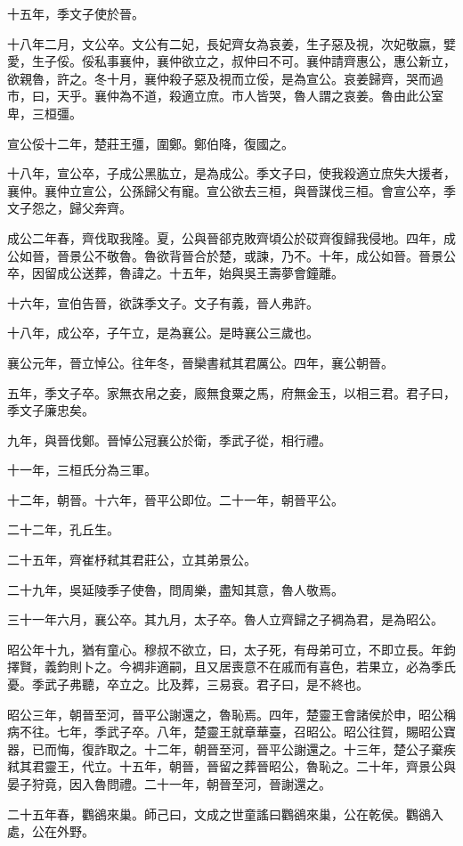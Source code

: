十五年，季文子使於晉。

十八年二月，文公卒。文公有二妃，長妃齊女為哀姜，生子惡及視，次妃敬嬴，嬖愛，生子俀。俀私事襄仲，襄仲欲立之，叔仲曰不可。襄仲請齊惠公，惠公新立，欲親魯，許之。冬十月，襄仲殺子惡及視而立俀，是為宣公。哀姜歸齊，哭而過市，曰，天乎。襄仲為不道，殺適立庶。市人皆哭，魯人謂之哀姜。魯由此公室卑，三桓彊。

宣公俀十二年，楚莊王彊，圍鄭。鄭伯降，復國之。

十八年，宣公卒，子成公黑肱立，是為成公。季文子曰，使我殺適立庶失大援者，襄仲。襄仲立宣公，公孫歸父有寵。宣公欲去三桓，與晉謀伐三桓。會宣公卒，季文子怨之，歸父奔齊。

成公二年春，齊伐取我隆。夏，公與晉郤克敗齊頃公於砹齊復歸我侵地。四年，成公如晉，晉景公不敬魯。魯欲背晉合於楚，或諫，乃不。十年，成公如晉。晉景公卒，因留成公送葬，魯諱之。十五年，始與吳王壽夢會鐘離。

十六年，宣伯告晉，欲誅季文子。文子有義，晉人弗許。

十八年，成公卒，子午立，是為襄公。是時襄公三歲也。

襄公元年，晉立悼公。往年冬，晉欒書弒其君厲公。四年，襄公朝晉。

五年，季文子卒。家無衣帛之妾，廄無食粟之馬，府無金玉，以相三君。君子曰，季文子廉忠矣。

九年，與晉伐鄭。晉悼公冠襄公於衛，季武子從，相行禮。

十一年，三桓氏分為三軍。

十二年，朝晉。十六年，晉平公即位。二十一年，朝晉平公。

二十二年，孔丘生。

二十五年，齊崔杼弒其君莊公，立其弟景公。

二十九年，吳延陵季子使魯，問周樂，盡知其意，魯人敬焉。

三十一年六月，襄公卒。其九月，太子卒。魯人立齊歸之子裯為君，是為昭公。

昭公年十九，猶有童心。穆叔不欲立，曰，太子死，有母弟可立，不即立長。年鈞擇賢，義鈞則卜之。今裯非適嗣，且又居喪意不在戚而有喜色，若果立，必為季氏憂。季武子弗聽，卒立之。比及葬，三易衰。君子曰，是不終也。

昭公三年，朝晉至河，晉平公謝還之，魯恥焉。四年，楚靈王會諸侯於申，昭公稱病不往。七年，季武子卒。八年，楚靈王就章華臺，召昭公。昭公往賀，賜昭公寶器，已而悔，復詐取之。十二年，朝晉至河，晉平公謝還之。十三年，楚公子棄疾弒其君靈王，代立。十五年，朝晉，晉留之葬晉昭公，魯恥之。二十年，齊景公與晏子狩竟，因入魯問禮。二十一年，朝晉至河，晉謝還之。

二十五年春，鸜鵒來巢。師己曰，文成之世童謠曰鸜鵒來巢，公在乾侯。鸜鵒入處，公在外野。

